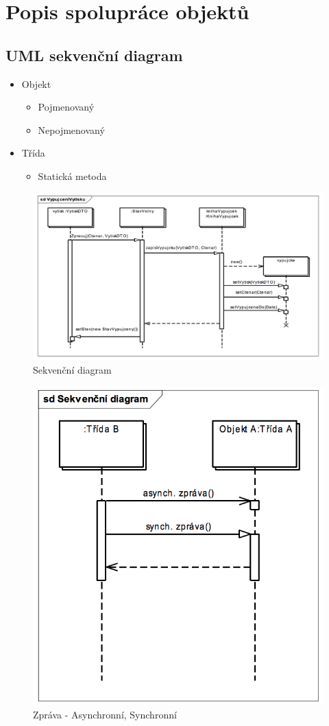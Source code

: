 \documentclass{szzclass}
\begin{document}
\section{Popis spolupráce objektů}
\subsection{UML sekvenční diagram}
\begin{itemize}
\item Objekt
  \begin{itemize}
  \item Pojmenovaný
  \item Nepojmenovaný
  \end{itemize}
\item Třída
  \begin{itemize}
  \item Statická metoda
  \end{itemize}
\end{itemize}

\begin{figure}[ht!]
\centering
\includegraphics[width=.55\linewidth]{topics/bi-wsi-si-20/images/sekvencni-diagram.png}
\caption{Sekvenční diagram}
\end{figure}

\begin{figure}[ht!]
\centering
\includegraphics[width=.55\linewidth]{topics/bi-wsi-si-20/images/sekvencni-async.png}
\caption{Zpráva - Asynchronní, Synchronní}
\end{figure}
\end{document}
